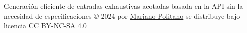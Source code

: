 \begin{titlepage}
\begin{center}
Generación eficiente de entradas exhaustivas acotadas basada en la API sin la necesidad de especificaciones © 2024 por \href{https://mpolitano.github.io}{Mariano Politano} se distribuye bajo licencia \href{https://creativecommons.org/licenses/by-nc-sa/4.0/}{CC BY-NC-SA 4.0} 
\end{center}

\end{titlepage} 



